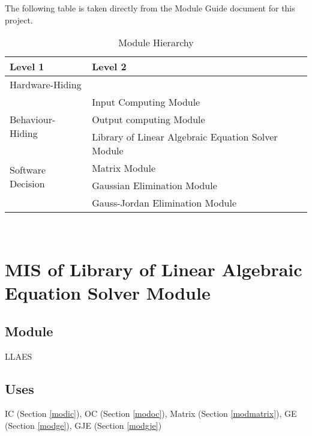 \documentclass[12pt, titlepage]{article}
\begin{document}
The following table is taken directly from the Module Guide document for this project.

\begin{table}[h!]
\centering
\begin{tabular}{p{} p{}}
\toprule
\textbf{Level 1} & \textbf{Level 2}\\
\midrule

{Hardware-Hiding} & ~ \\
\midrule

\multirow{3}{0.3\textwidth}{Behaviour-Hiding} 
& Input Computing Module\\
& Output computing Module\\
& Library of Linear Algebraic Equation Solver Module\\


\midrule

\multirow{2}{0.3\textwidth}{Software Decision}  
& Matrix Module\\

& Gaussian Elimination Module\\

& Gauss-Jordan Elimination Module\\


\bottomrule

\end{tabular}
\caption{Module Hierarchy}
\label{TblMH}
\end{table}


\newpage
~\newpage

\section{MIS of {Library of Linear Algebraic Equation Solver Module}} \label{modllaes} %

\subsection{Module}

LLAES


\subsection{Uses}
IC (Section \ref{modic}), OC (Section \ref{modoc}), Matrix (Section \ref{modmatrix}), GE (Section \ref{modge}), GJE (Section \ref{modgje})
\end{document}
